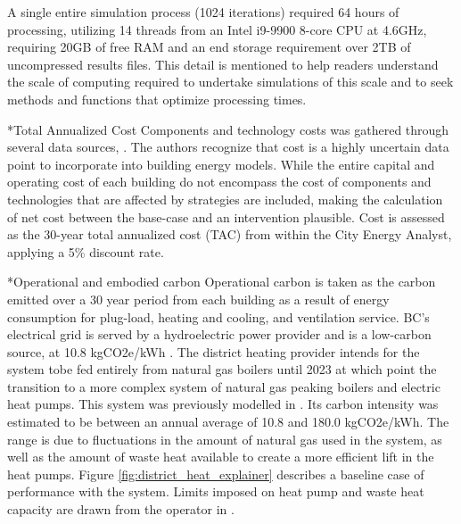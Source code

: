 \documentclass[twocolumn, a4paper,10pt]{article}
\makeatletter
\renewcommand\subsection{\@startsection{subsection}{1}{\z@}{\z@}{\z@}{\normalfont\normalsize\bfseries}}
\renewcommand\subsection{\@startsection{subsection}{1}{\z@}{\z@}{0.1pt}{\normalfont\normalsize\bfseries}}
\makeatother
\begin{document}
A single entire simulation process (1024 iterations) required 64 hours of processing, utilizing 14 threads from an Intel i9-9900 8-core CPU at 4.6GHz, requiring 20GB of free RAM and an end storage requirement over 2TB of uncompressed results files. This detail is mentioned to help readers understand the scale of computing required to undertake simulations of this scale and to seek methods and functions that optimize processing times. 

\subsection*{Total Annualized Cost}
Components and technology costs was gathered through several data sources, \citep{noauthor_cpcn_2014,schlueter_3for2_2016,salasovich_energy_2016,kegel_life_nodate,gordian_rsmeans_2020}. The authors recognize that cost is a highly uncertain data point to incorporate into building energy models. While the entire capital and operating cost of each building do not encompass the cost of components and technologies that are affected by strategies are included, making the calculation of net cost between the base-case and an intervention plausible. Cost is assessed as the 30-year total annualized cost (TAC) from within the City Energy Analyst, applying a 5\% discount rate.

\subsection*{Operational and embodied carbon}
Operational carbon is taken as the carbon emitted over a 30 year period from each building as a result of energy consumption for plug-load, heating and cooling, and ventilation service. BC's electrical grid is served by a hydroelectric power provider and is a low-carbon source, at 10.8 kgCO2e/kWh \citep{bc_ministry_of_envrionmetn_and_climate_change_strategy_bc_2019}. The district heating provider intends for the system tobe  fed entirely from natural gas boilers until 2023 at which point the transition to a more complex system of natural gas peaking boilers and electric heat pumps. This system was previously modelled in \citet{mccarty_accepted_2020}. Its carbon intensity was estimated to be between an annual average of 10.8 and 180.0 kgCO2e/kWh. The range is due to fluctuations in the amount of natural gas used in the system, as well as the amount of waste heat available to create a more efficient lift in the heat pumps. Figure \ref{fig:district_heat_explainer} describes a baseline case of performance with the system. Limits imposed on heat pump and waste heat capacity are drawn from the operator in \citet{noauthor_infrastructure_2014}.
\end{document}
